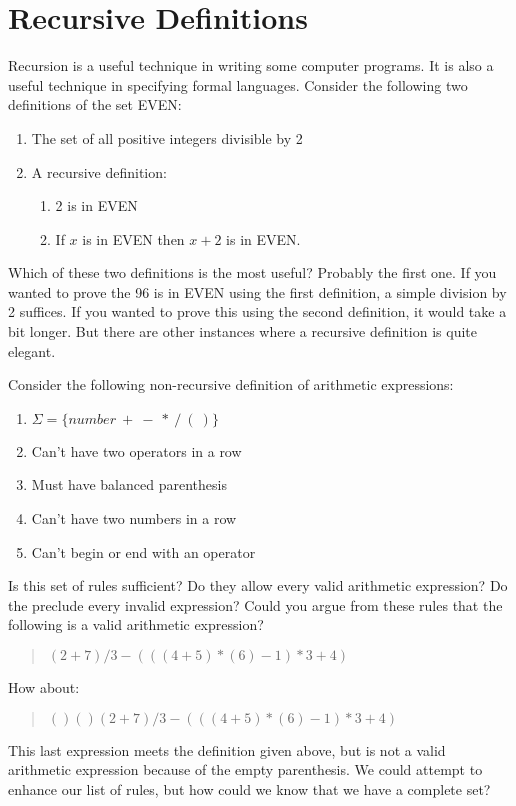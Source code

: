 \documentclass[letterpaper,12pt,openany,reqno]{book}%
\begin{document}
\chapter{Recursive Definitions}
Recursion is a useful technique in writing some computer programs. It is also a useful technique in specifying formal languages. Consider the following two definitions of the set EVEN:
\begin{enumerate}
\item The set of all positive integers divisible by 2
\item A recursive definition:
\begin{enumerate}
\item 2 is in EVEN
\item If $x$ is in EVEN then $x+2$ is in EVEN.
\end{enumerate}
\end{enumerate}

Which of these two definitions is the most useful? Probably the first one. If you wanted to prove the 96 is in EVEN using the first definition, a simple division by 2 suffices. If you wanted to prove this using the second definition, it would take a bit longer. But there are other instances where a recursive definition is quite elegant.

Consider the following non-recursive definition of arithmetic expressions:
\begin{enumerate}
\item $\Sigma = \{ number\ +\ -\ *\ /\ (\ ) \}$
\item Can't have two operators in a row
\item Must have balanced parenthesis
\item Can't have two numbers in a row
\item Can't begin or end with an operator
\end{enumerate}

Is this set of rules sufficient? Do they allow every valid arithmetic expression? Do the preclude every invalid expression? Could you argue from these rules that the following is a valid arithmetic expression?
\begin{quote}
$(2+7)/3-(((4+5)*(6)-1)*3 + 4)$
\end{quote}
How about:
\begin{quote}
$()()(2+7)/3-(((4+5)*(6)-1)*3 + 4)$
\end{quote}
This last expression meets the definition given above, but is not a valid arithmetic expression because of the empty parenthesis. We could attempt to enhance our list of rules, but how could we know that we have a complete set?
\end{document}
